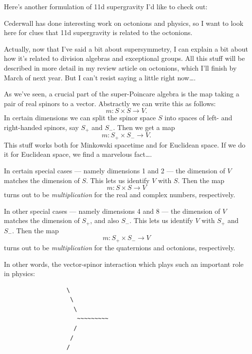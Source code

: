\documentclass{article}
\def\tightlist{}
\renewcommand{\texttt}[1]{%
  \begingroup
  \ttfamily
  \begingroup\lccode`~=`/\lowercase{\endgroup\def~}{/\discretionary{}{}{}}%
  \begingroup\lccode`~=`[\lowercase{\endgroup\def~}{[\discretionary{}{}{}}%
  \begingroup\lccode`~=`.\lowercase{\endgroup\def~}{.\discretionary{}{}{}}%
  \catcode`/=\active\catcode`[=\active\catcode`.=\active
  \scantokens{#1\noexpand}%
  \endgroup
}
\begin{document}
Here's another formulation of 11d supergravity I'd like to check out:


Cederwall has done interesting work on octonions and physics, so I want
to look here for clues that 11d supergravity is related to the
octonions.

Actually, now that I've said a bit about supersymmetry, I can explain a
bit about how it's related to division algebras and exceptional groups.
All this stuff will be described in more detail in my review article on
octonions, which I'll finish by March of next year. But I can't resist
saying a little right now\ldots.

As we've seen, a crucial part of the super-Poincare algebra is the map
taking a pair of real spinors to a vector. Abstractly we can write this
as follows: \[m\colon  S \times S \to  V.\] In certain dimensions we can
split the spinor space \(S\) into spaces of left- and right-handed
spinors, say \(S_+\) and \(S_-\). Then we get a map
\[m\colon  S_+ \times S_- \to  V.\] This stuff works both for Minkowski
spacetime and for Euclidean space. If we do it for Euclidean space, we
find a marvelous fact\ldots.

In certain special cases --- namely dimensions 1 and 2 --- the dimension
of \(V\) matches the dimension of \(S\). This lets us identify \(V\)
with \(S\). Then the map \[m\colon  S \times S \to V\] turns out to be
\emph{multiplication} for the real and complex numbers, respectively.

In other special cases --- namely dimensions 4 and 8 --- the dimension
of \(V\) matches the dimension of \(S_+\), and also \(S_-\). This lets
us identify \(V\) with \(S_+\) and \(S_-\). Then the map
\[m\colon  S_+ \times S_- \to  V\] turns out to be \emph{multiplication}
for the quaternions and octonions, respectively.

In other words, the vector-spinor interaction which plays such an
important role in physics:

\begin{verbatim}
                  \
                   \
                    \
                     ~~~~~~~~~
                    /
                   /
                  /
\end{verbatim}
\end{document}
